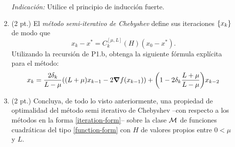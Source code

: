 \documentclass{article}
\begin{document}
\begin{enumerate}
\begin{enumerate}
        \textit{Indicación:} Utilice el principio de inducción fuerte.
        \item (2 pt.) El \textit{método semi-iterativo de Chebyshev} define sus iteraciones \(\qty{x_k}\) de modo que
        \[x_k - x^* = C_k^{[\mu, L]}(H)(x_0 - x^*).\]
        Utilizando la recursión de P1.b, obtenga la siguiente fórmula explícita para el método:
        \[x_k = \frac{2\delta_k}{L - \mu} \qty((L + \mu)x_{k-1} - 2 \grad f(x_{k-1})) + \qty(1 - 2 \delta_k \frac{L+\mu}{L - \mu})x_{k-2}\]
        \item (2 pt.) Concluya, de todo lo visto anteriormente, una propiedad de optimalidad del método semi iterativo de Chebyshev --con respecto a los métodos en la forma \ref{iteration-form}-- sobre la clase \(\mathcal{M}\) de funciones cuadráticas del tipo \ref{function-form} con \(H\) de valores propios entre \(0 < \mu\) y \(L\).
    \end{enumerate}
\end{enumerate}

    
\end{document}
